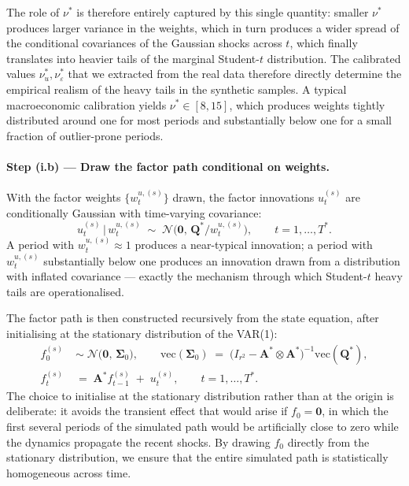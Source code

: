 \documentclass[11pt, a4paper, oneside]{article}
\newcommand{\mA}{\mathbf{A}}
\newcommand{\mQ}{\mathbf{Q}}
\begin{document}
The role of $\nu^*$ is therefore entirely captured by this single
quantity: smaller $\nu^*$ produces larger variance in the weights,
which in turn produces a wider spread of the conditional
covariances of the Gaussian shocks across $t$, which finally
translates into heavier tails of the marginal Student-$t$
distribution. The calibrated values $\nu_u^*, \nu_\varepsilon^*$
that we extracted from the real data therefore directly determine
the empirical realism of the heavy tails in the synthetic samples.
A typical macroeconomic calibration yields
$\nu^* \in [8, 15]$, which produces weights tightly distributed
around one for most periods and substantially below one for a
small fraction of outlier-prone periods.

\paragraph{Step (i.b) — Draw the factor path conditional on weights.}
With the factor weights $\{w_t^{u, (s)}\}$ drawn, the factor
innovations $u_t^{(s)}$ are conditionally Gaussian with time-varying
covariance:
\[
u_t^{(s)} \,\big|\, w_t^{u, (s)} \;\sim\; \mathcal{N}\!\Big(\mathbf{0},\, \mQ^* / w_t^{u, (s)}\Big),
\qquad t = 1, \ldots, T^*.
\]
A period with $w_t^{u, (s)} \approx 1$ produces a near-typical
innovation; a period with $w_t^{u, (s)}$ substantially below one
produces an innovation drawn from a distribution with inflated
covariance — exactly the mechanism through which Student-$t$
heavy tails are operationalised.

The factor path is then constructed recursively from the state
equation, after initialising at the stationary distribution of the
VAR(1):
\begin{align}
f_0^{(s)} \;&\sim\; \mathcal{N}\!\big(\mathbf{0},\, \boldsymbol{\Sigma}_0\big), \qquad
\mathrm{vec}(\boldsymbol{\Sigma}_0) \;=\; \big(I_{r^2} - \mA^* \otimes \mA^*\big)^{-1} \mathrm{vec}(\mQ^*), \\[2pt]
f_t^{(s)} \;&=\; \mA^* f_{t-1}^{(s)} \;+\; u_t^{(s)}, \qquad t = 1, \ldots, T^*.
\end{align}
The choice to initialise at the stationary distribution rather
than at the origin is deliberate: it avoids the transient effect
that would arise if $f_0 = \mathbf{0}$, in which the first
several periods of the simulated path would be artificially close
to zero while the dynamics propagate the recent shocks. By drawing
$f_0$ directly from the stationary distribution, we ensure that
the entire simulated path is statistically homogeneous across
time.
\end{document}
